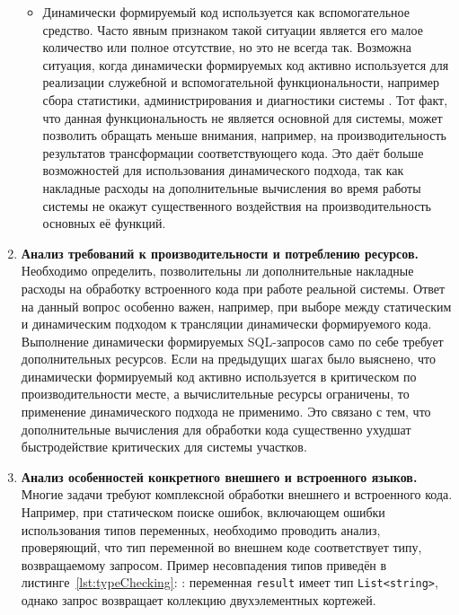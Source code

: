 \begin{enumerate}
\begin{itemize}
    \item Динамически формируемый код используется как вспомогательное средство. Часто явным признаком такой ситуации является его малое количество или полное отсутствие, но это не всегда так. Возможна ситуация, когда динамически формируемых код активно используется для реализации служебной и вспомогательной функциональности, например сбора статистики, администрирования и диагностики системы . Тот факт, что данная функциональность не является основной для системы, может позволить обращать меньше внимания, например, на производительность результатов трансформации соответствующего кода. Это даёт больше возможностей для использования динамического подхода, так как накладные расходы на дополнительные вычисления во время работы системы не окажут существенного воздействия на производительность основных её функций.
  \end{itemize}
    
  \item \textbf{Анализ требований к производительности и потреблению ресурсов.} Необходимо определить, позволительны ли дополнительные накладные расходы на обработку встроенного кода при работе реальной системы. Ответ на данный вопрос особенно важен, например, при выборе между статическим и динамическим подходом к трансляции динамически формируемого кода. Выполнение динамически формируемых SQL-запросов само по себе требует дополнительных ресурсов. Если на предыдущих шагах было выяснено, что динамически формируемый код активно используется в критическом по производительности месте, а вычислительные ресурсы ограничены, то применение динамического подхода не применимо. Это связано с тем, что дополнительные вычисления для обработки кода существенно ухудшат быстродействие критических для системы участков.
  
  \item \textbf{Анализ особенностей конкретного внешнего и встроенного языков.} Многие задачи требуют комплексной обработки внешнего и встроенного кода. Например, при статическом поиске ошибок, включающем ошибки использования типов переменных, необходимо проводить анализ, проверяющий, что тип переменной во внешнем коде соответствует типу, возвращаемому запросом. Пример несовпадения типов приведён в листинге~\ref{lst:typeChecking}: : переменная \texttt{result} имеет тип \texttt{List<string>}, однако запрос возвращает коллекцию двухэлементных кортежей.
  
\begin{listing}
    \begin{pyglist}[language=csharp,numbers=left,numbersep=5pt]


\end{pyglist}
\end{listing}
\end{enumerate}
